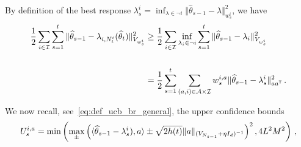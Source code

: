 By definition of the best response $\lambda_s^i = \inf_{\lambda \in \neg i} \Vert \hat{\theta}_{s-1} - \lambda \Vert_{w_s^i}^2$, we have
\begin{align}
\frac{1}{2}\sum_{i\in\mathcal{I}} \sum_{s=1}^t  \Vert \widehat{\theta}_{s-1} - \lambda_{i,N_t^i}(\widehat{\theta}_t)\Vert_{V_{w_s^i}}^2
&\geq\frac{1}{2}\sum_{i\in\mathcal{I}} \inf_{\lambda_i \in \neg i} \sum_{s=1}^t \Vert \widehat{\theta}_{s-1} - \lambda_i\Vert_{V_{w_s^i}}^2
\nonumber\\
\nonumber\\
&=\frac{1}{2} \sum_{s=1}^t \sum_{(a,i)\in\mathcal{A}\times\mathcal{I}} w_s^{i,a}\Vert \widehat{\theta}_{s-1} - \lambda_s^i\Vert_{a a^{\mathsf{\scriptscriptstyle T}}}^2\,.\label{eq:to_br_cvx}
\end{align}

We now recall, see~\eqref{eq:def_ucb_br_general}, the upper confidence bounds
\[U_s^{i,a} = \min\left(\max_\pm \left( \langle \widehat{\theta}_{s-1} - \lambda^{i}_s), a\rangle \pm \sqrt{2 h(t)} \lVert a\rVert_{(V_{N_{s-1}}+\eta I_d)^{-1}} \right)^2,4L^2M^2\right)\,,\]


